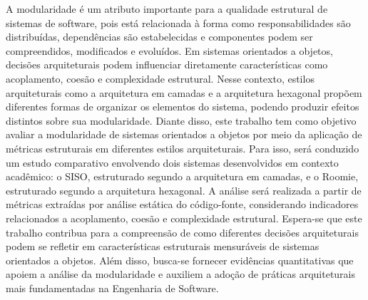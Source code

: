 A modularidade é um atributo importante para a qualidade estrutural de sistemas de software, pois está relacionada à 
forma como responsabilidades são distribuídas, dependências são estabelecidas e componentes podem ser compreendidos, 
modificados e evoluídos. Em sistemas orientados a objetos, decisões arquiteturais podem influenciar diretamente características 
como acoplamento, coesão e complexidade estrutural. Nesse contexto, estilos arquiteturais como a arquitetura em camadas e a 
arquitetura hexagonal propõem diferentes formas de organizar os elementos do sistema, podendo produzir efeitos distintos sobre 
sua modularidade. Diante disso, este trabalho tem como objetivo avaliar a modularidade de sistemas orientados a objetos por meio 
da aplicação de métricas estruturais em diferentes estilos arquiteturais. Para isso, será conduzido um estudo comparativo envolvendo 
dois sistemas desenvolvidos em contexto acadêmico: o SISO, estruturado segundo a arquitetura em camadas, e o Roomie, estruturado 
segundo a arquitetura hexagonal. A análise será realizada a partir de métricas extraídas por análise estática do código-fonte, 
considerando indicadores relacionados a acoplamento, coesão e complexidade estrutural. Espera-se que este trabalho contribua para 
a compreensão de como diferentes decisões arquiteturais podem se refletir em características estruturais mensuráveis de sistemas 
orientados a objetos. Além disso, busca-se fornecer evidências quantitativas que apoiem a análise da modularidade e auxiliem a adoção 
de práticas arquiteturais mais fundamentadas na Engenharia de Software.

